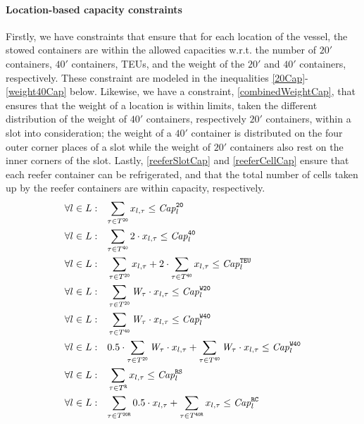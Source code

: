 \paragraph{Location-based capacity constraints}
Firstly, we have constraints that ensure that for each location of the vessel, the stowed containers are within the allowed capacities w.r.t. the number of $20'$ containers, $40'$ containers, TEUs, and the weight of the $20'$ and $40'$ containers, respectively. These constraint are modeled in the inequalities \eqref{20Cap}-\eqref{weight40Cap} below.
{Likewise, we have a constraint, \eqref{combinedWeightCap}, that ensures that the weight of a location is within limits, taken the different distribution of the weight of $40'$ containers, respectively $20'$ containers, within a slot into consideration; the weight of a $40'$ container is distributed on the four outer corner places of a slot while the weight of $20'$ containers also rest on the inner corners of the slot.}
Lastly, \eqref{reeferSlotCap} and \eqref{reeferCellCap} ensure that each reefer container can be refrigerated, and that {the total number of cells taken up by the reefer containers are within capacity}, respectively. 
\begin{align}
{\forall l \in L:}&\quad
	\label{20Cap}
	{\sum_{\tau \in T^\trt{20}} x_{l,\tau} \leq \Ca_l^\trt{20}}\\
%
\label{40Cap}    	
	{\forall l \in L:}&\quad
	{\sum_{\tau \in T^\trt{40}} 2\cdot x_{l,\tau} \leq \Ca_l^\trt{40}}\\
%
\label{teuCap}
	\forall l \in L:&\quad
	\sum_{\tau \in T^\trt{20}} x_{l,\tau} + 2\cdot\sum_{\tau \in T^\trt{40}} x_{l,\tau} \leq \Ca_l^\trt{TEU}\\
%
%
\label{weight20Cap}
	\forall l \in L:&\quad\sum_{\tau \in T^\trt{20}} \Weight_\tau\cdot x_{l,\tau} \leq \Ca_l^\trt{W20}\\
%
\label{weight40Cap}
	\forall l \in L:&\quad\sum_{\tau \in T^\trt{40}} \Weight_\tau\cdot x_{l,\tau} \leq \Ca_l^\trt{W40}\\
%
\label{combinedWeightCap}
	\forall l \in L:&\quad 0.5\cdot \sum_{\tau \in T^\trt{20}} \Weight_\tau\cdot x_{l,\tau} + \sum_{\tau \in T^\trt{40}		} \Weight_\tau\cdot x_{l,\tau} \leq \Ca_l^\trt{W40}\\
%
\label{reeferSlotCap}
	\forall l \in L:&\quad\sum_{\tau \in T^\trt{R}} x_{l,\tau} \leq \Ca_l^\trt{RS}\\
%
\label{reeferCellCap}
	{\forall l \in L:}&\quad
	{\sum_{\tau \in T^\trt{20R}} 0.5\cdot x_{l,\tau} + \sum_{\tau \in T^\trt{40R}} x_{l,\tau} \leq \Ca_l^\trt{RC}}
%   	
\end{align}	 
%
